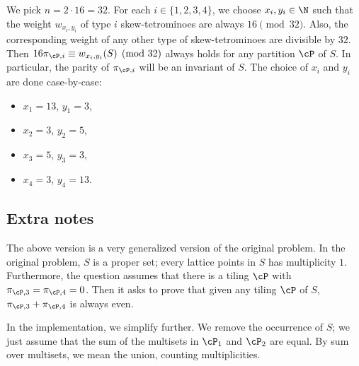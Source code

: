 We pick $n = 2 \cdot 16 = 32$.
For each $i \in \{1, 2, 3, 4\}$, we choose $x_i, y_i \in \N$ such that the weight $w_{x_i, y_i}$ of type $i$ skew-tetrominoes are always $16 \pmod{32}$.
Also, the corresponding weight of any other type of skew-tetrominoes are divisible by $32$.
Then $16 \pi_{\cP, i} \equiv w_{x_i, y_i}(S) \pmod{32}$ always holds for any partition $\cP$ of $S$.
In particular, the parity of $\pi_{\cP, i}$ will be an invariant of $S$.
The choice of $x_i$ and $y_i$ are done case-by-case:
\begin{itemize}
    \item   $x_1 = 13$, $y_1 = 3$,
    \item   $x_2 = 3$, $y_2 = 5$,
    \item   $x_3 = 5$, $y_3 = 3$,
    \item   $x_4 = 3$, $y_4 = 13$.
\end{itemize}



\subsection*{Extra notes}

The above version is a very generalized version of the original problem.
In the original problem, $S$ is a proper set; every lattice points in $S$ has multiplicity $1$.
Furthermore, the question assumes that there is a tiling $\cP$ with $\pi_{\cP, 3} = \pi_{\cP, 4} = 0$.
Then it asks to prove that given any tiling $\cP$ of $S$, $\pi_{\cP, 3} + \pi_{\cP, 4}$ is always even.

In the implementation, we simplify further.
We remove the occurrence of $S$; we just assume that the sum of the multisets in $\cP_1$ and $\cP_2$ are equal.
By sum over multisets, we mean the union, counting multiplicities.
